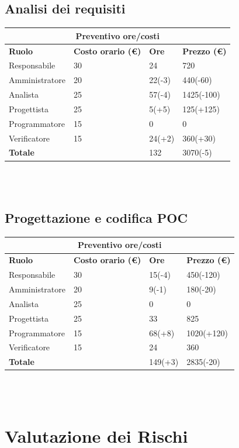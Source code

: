 \documentclass[9pt]{article}
\begin{document}
\subsection{Analisi dei requisiti}
\begin{center}
	\begin{tabularx}{\textwidth}{|X|X|X|X|}
		\hline
		\multicolumn{4}{|c|}{\textbf{Preventivo ore/costi}}                                      \\
		\hline
		\hline
		\textbf{Ruolo}  & \textbf{Costo orario (\euro)} & \textbf{Ore} & \textbf{Prezzo (\euro)} \\
		\hline									
		Responsabile    &	30		&	24		&	720		\\
		\hline									
		Amministratore  &	20		&	22(-3)		&	440(-60)		\\
		\hline									
		Analista        &	25		&	57(-4)		&	1425(-100)		\\
		\hline									
		Progettista     &	25		&	5(+5)		&	125(+125)		\\
		\hline									
		Programmatore   &	15		&	0		&	0		\\
		\hline									
		Verificatore    &	15		&	24(+2)		&	360(+30)		\\
		\hline									
		\textbf{Totale} &			&	132		&	3070(-5)		\\
		\hline																														
	\end{tabularx}\\[8pt]
	\mbox{}\\
\end{center}

\subsection{Progettazione e codifica POC}

\begin{center}
	\begin{tabularx}{\textwidth}{|X|X|X|X|}
		\hline
		\multicolumn{4}{|c|}{\textbf{Preventivo ore/costi}}                                      \\
		\hline
		\hline
		\textbf{Ruolo}  & \textbf{Costo orario (\euro)} & \textbf{Ore} & \textbf{Prezzo (\euro)} \\
		\hline									
		Responsabile    &	30		&	15(-4)		&	450(-120)		\\
		\hline									
		Amministratore  &	20		&	9(-1)		&	180(-20)		\\
		\hline									
		Analista        &	25		&	0		&	0		\\
		\hline									
		Progettista     &	25		&	33		&	825		\\
		\hline									
		Programmatore   &	15		&	68(+8)		&	1020(+120)		\\
		\hline									
		Verificatore    &	15		&	24		&	360		\\
		\hline									
		\textbf{Totale} &			&	149(+3)		&	2835(-20)		\\
		\hline																														
	\end{tabularx}\\[8pt]
	\mbox{}\\
\end{center}
	
\section{Valutazione dei Rischi}
\end{document}
